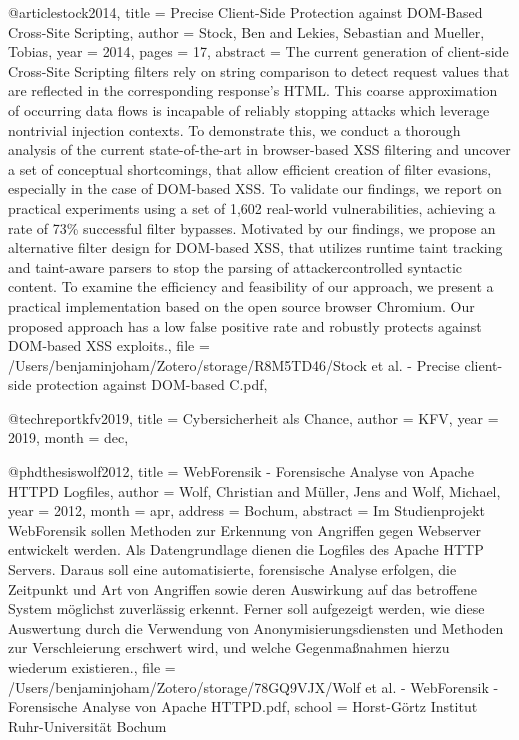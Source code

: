 @article{stock2014,
  title = {Precise Client-Side Protection against {{DOM}}-Based {{Cross}}-{{Site Scripting}}},
  author = {Stock, Ben and Lekies, Sebastian and Mueller, Tobias},
  year = {2014},
  pages = {17},
  abstract = {The current generation of client-side Cross-Site Scripting filters rely on string comparison to detect request values that are reflected in the corresponding response's HTML. This coarse approximation of occurring data flows is incapable of reliably stopping attacks which leverage nontrivial injection contexts. To demonstrate this, we conduct a thorough analysis of the current state-of-the-art in browser-based XSS filtering and uncover a set of conceptual shortcomings, that allow efficient creation of filter evasions, especially in the case of DOM-based XSS. To validate our findings, we report on practical experiments using a set of 1,602 real-world vulnerabilities, achieving a rate of 73\% successful filter bypasses. Motivated by our findings, we propose an alternative filter design for DOM-based XSS, that utilizes runtime taint tracking and taint-aware parsers to stop the parsing of attackercontrolled syntactic content. To examine the efficiency and feasibility of our approach, we present a practical implementation based on the open source browser Chromium. Our proposed approach has a low false positive rate and robustly protects against DOM-based XSS exploits.},
  file = {/Users/benjaminjoham/Zotero/storage/R8M5TD46/Stock et al. - Precise client-side protection against DOM-based C.pdf},
}




@techreport{kfv2019,
  title = {{Cybersicherheit als Chance}},
  author = {KFV},
  year = {2019},
  month = dec,
}



@phdthesis{wolf2012,
  title = {{WebForensik - Forensische Analyse von Apache HTTPD Logfiles}},
  author = {Wolf, Christian and M{\"u}ller, Jens and Wolf, Michael},
  year = {2012},
  month = apr,
  address = {{Bochum}},
  abstract = {Im Studienprojekt WebForensik sollen Methoden zur Erkennung von Angriffen gegen
Webserver entwickelt werden. Als Datengrundlage dienen die Logfiles des Apache
HTTP Servers. Daraus soll eine automatisierte, forensische Analyse erfolgen, die Zeitpunkt und Art von Angriffen sowie deren Auswirkung auf das betroffene System
m{\"o}glichst zuverl{\"a}ssig erkennt. Ferner soll aufgezeigt werden, wie diese Auswertung
durch die Verwendung von Anonymisierungsdiensten und Methoden zur Verschleierung erschwert wird, und welche Gegenma{\ss}nahmen hierzu wiederum existieren.},
  file = {/Users/benjaminjoham/Zotero/storage/78GQ9VJX/Wolf et al. - WebForensik - Forensische Analyse von Apache HTTPD.pdf},
  school = {Horst-G{\"o}rtz Institut Ruhr-Universit{\"a}t Bochum}
}



